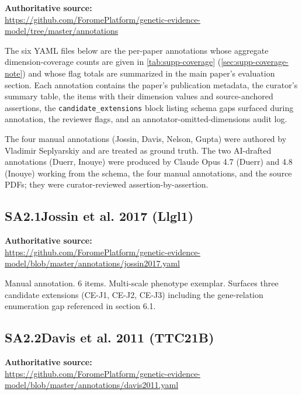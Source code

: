 \noindent\textbf{Authoritative source:}\\
\url{https://github.com/ForomePlatform/genetic-evidence-model/tree/master/annotations}

\medskip
\noindent The six YAML files below are the per-paper annotations whose
aggregate dimension-coverage counts are given in \cref{tab:supp-coverage}
(\cref{sec:supp-coverage-note}) and whose flag totals are summarized in
the main paper's evaluation section. Each annotation contains
the paper's publication metadata, the curator's summary table, the
\GeneticEvidence{} items with their dimension values and
source-anchored assertions, the \texttt{candidate\_extensions} block
listing schema gaps surfaced during annotation, the reviewer flags,
and an annotator-omitted-dimensions audit log.

The four manual annotations (Jossin, Davis, Nelson, Gupta) were
authored by Vladimir Seplyarskiy and are treated as ground truth. The
two AI-drafted annotations (Duerr, Inouye) were produced by Claude
Opus 4.7 (Duerr) and 4.8 (Inouye) working from the schema, the four manual
annotations, and the source PDFs; they were curator-reviewed
assertion-by-assertion.

\subsection*{SA2.1\quad Jossin et al. 2017 (Llgl1)}

\noindent\textbf{Authoritative source:}\\
\url{https://github.com/ForomePlatform/genetic-evidence-model/blob/master/annotations/jossin2017.yaml}

\medskip
\noindent Manual annotation. 6 \GeneticEvidence{} items. Multi-scale
phenotype exemplar. Surfaces three candidate extensions (CE-J1, CE-J2,
CE-J3) including the gene-relation enumeration gap referenced in
section 6.1.



\subsection*{SA2.2\quad Davis et al. 2011 (TTC21B)}

\noindent\textbf{Authoritative source:}\\
\url{https://github.com/ForomePlatform/genetic-evidence-model/blob/master/annotations/davis2011.yaml}

